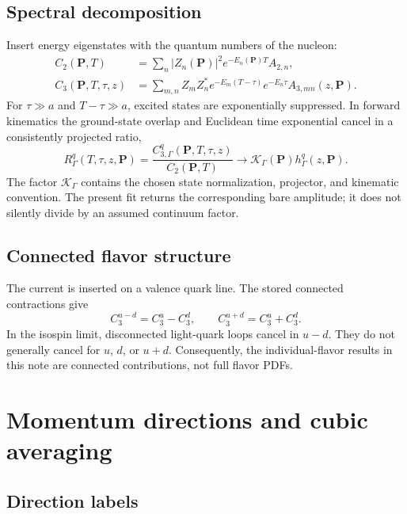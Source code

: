 \documentclass[11pt]{article}
\numberwithin{equation}{section}
\begin{document}
\subsection{Spectral decomposition}

Insert energy eigenstates with the quantum numbers of the nucleon:
\begin{align}
  C_2(\bm P,T)
  &=\sum_n |Z_n(\bm P)|^2 e^{-E_n(\bm P)T}A_{2,n},
  \\
  C_3(\bm P,T,\tau,z)
  &=\sum_{m,n}Z_m Z_n^*
    e^{-E_m(T-\tau)}e^{-E_n\tau}
    A_{3,mn}(z,\bm P).
  \label{eq:spectral-decomposition}
\end{align}
For $\tau\gg a$ and $T-\tau\gg a$, excited states are exponentially
suppressed.  In forward kinematics the ground-state overlap and Euclidean
time exponential cancel in a consistently projected ratio,
\begin{equation}
  R_\Gamma^q(T,\tau,z,\bm P)
  =\frac{C_{3,\Gamma}^{q}(\bm P,T,\tau,z)}
         {C_2(\bm P,T)}
  \longrightarrow \mathcal K_\Gamma(\bm P)h_\Gamma^q(z,\bm P).
  \label{eq:ratio-ground-state}
\end{equation}
The factor $\mathcal K_\Gamma$ contains the chosen state normalization,
projector, and kinematic convention.  The present fit returns the corresponding
bare amplitude; it does not silently divide by an assumed continuum factor.

\subsection{Connected flavor structure}

The current is inserted on a valence quark line.  The stored connected
contractions give
\begin{equation}
  C_3^{u-d}=C_3^u-C_3^d,
  \qquad C_3^{u+d}=C_3^u+C_3^d.
  \label{eq:flavor-combinations}
\end{equation}
In the isospin limit, disconnected light-quark loops cancel in $u-d$.
They do not generally cancel for $u$, $d$, or $u+d$.  Consequently, the
individual-flavor results in this note are connected contributions, not full
flavor PDFs.

\section{Momentum directions and cubic averaging}

\subsection{Direction labels}
\end{document}
